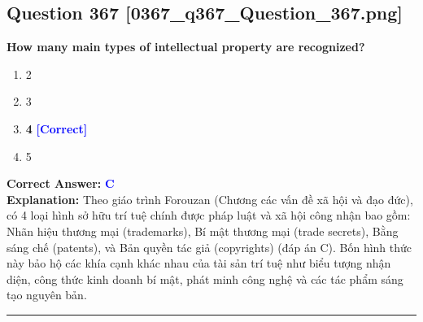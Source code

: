 \documentclass[11pt,a4paper]{article}
\begin{document}
\begin{minipage}{\textwidth}
\subsection*{Question 367 \quad \footnotesize{[0367\_q367\_Question\_367.png]}}
\noindent \textbf{How many main types of intellectual property are recognized?}

\begin{enumerate}[label=\Alph*.]
    \item 2
    \item 3
    \item \textbf{4} \hfill \textcolor{blue}{\textbf{[Correct]}}
    \item 5
\end{enumerate}

\noindent \textbf{Correct Answer:} \textcolor{blue}{\textbf{C}} \\[2pt]
\noindent \textbf{Explanation:} Theo giáo trình Forouzan (Chương các vấn đề xã hội và đạo đức), có 4 loại hình sở hữu trí tuệ chính được pháp luật và xã hội công nhận bao gồm: Nhãn hiệu thương mại (trademarks), Bí mật thương mại (trade secrets), Bằng sáng chế (patents), và Bản quyền tác giả (copyrights) (đáp án C). Bốn hình thức này bảo hộ các khía cạnh khác nhau của tài sản trí tuệ như biểu tượng nhận diện, công thức kinh doanh bí mật, phát minh công nghệ và các tác phẩm sáng tạo nguyên bản.

\par\vspace{0.3cm}
\hrule
\vspace{0.3cm}
\end{minipage}
\end{document}
